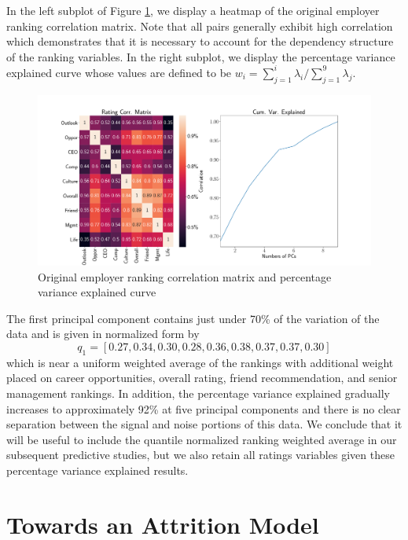 \documentclass[10pt]{article}
\begin{document}
In the left subplot of Figure \ref{fig:pcagr}, we display a heatmap of the 
original employer ranking correlation matrix.  Note that all pairs 
generally exhibit high correlation which demonstrates 
that it is necessary to account for the dependency structure of the ranking 
variables.  In the right subplot, we display the percentage variance explained curve 
whose values are defined to be $w_i = \sum_{j=1}^i\lambda_i/\sum_{j=1}^9\lambda_j$. 
%
\begin{figure}[thb]
    \centering
	\includegraphics[width=1.0\linewidth]{pcagr.pdf}
	\caption{Original employer ranking correlation matrix and percentage variance 
    explained curve}
	\label{fig:pcagr}
\end{figure}
%
The first principal component contains just under 70\% of the variation of the data 
and is given in normalized form by  
%
\begin{equation}
    q_1 = [0.27,0.34,0.30,0.28,0.36,0.38,0.37,0.37,0.30] 
\end{equation}
%
which is near a uniform weighted average of the rankings with additional 
weight placed on career opportunities, overall rating, friend recommendation, and 
senior management rankings. In addition, the percentage variance explained 
gradually increases to approximately 92\% at five principal components and 
there is no clear separation between the signal and noise portions of this data.
We conclude that it will be useful to include the quantile normalized 
ranking weighted average in our subsequent predictive studies, but we 
also retain all ratings variables given these percentage variance explained results. 

\section{Towards an Attrition Model}\label{modsec}
\end{document}
